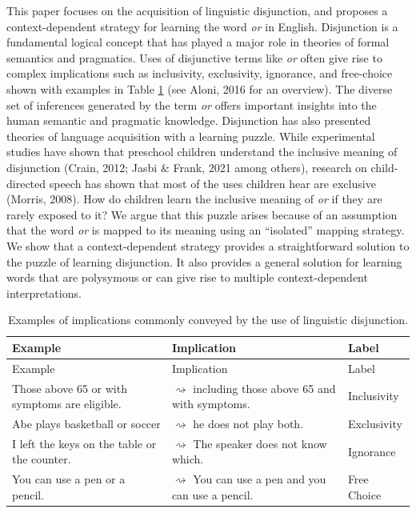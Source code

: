 \documentclass[
  english,
  ,man,floatsintext]{apa6}
\begin{document}
This paper focuses on the acquisition of linguistic disjunction, and proposes a context-dependent strategy for learning the word \emph{or} in English. Disjunction is a fundamental logical concept that has played a major role in theories of formal semantics and pragmatics. Uses of disjunctive terms like \emph{or} often give rise to complex implications such as inclusivity, exclusivity, ignorance, and free-choice shown with examples in Table \ref{tab:orexamples} (see Aloni, 2016 for an overview). The diverse set of inferences generated by the term \emph{or} offers important insights into the human semantic and pragmatic knowledge. Disjunction has also presented theories of language acquisition with a learning puzzle. While experimental studies have shown that preschool children understand the inclusive meaning of disjunction (Crain, 2012; Jasbi \& Frank, 2021 among others), research on child-directed speech has shown that most of the uses children hear are exclusive (Morris, 2008). How do children learn the inclusive meaning of \emph{or} if they are rarely exposed to it? We argue that this puzzle arises because of an assumption that the word \emph{or} is mapped to its meaning using an ``isolated'' mapping strategy. We show that a context-dependent strategy provides a straightforward solution to the puzzle of learning disjunction. It also provides a general solution for learning words that are polysymous or can give rise to multiple context-dependent interpretations.

\begin{longtable}[]{@{}
  >{\raggedright\arraybackslash}p{}
  >{\raggedright\arraybackslash}p{}
  >{\raggedright\arraybackslash}p{}@{}}
\caption{\label{tab:orexamples} Examples of implications commonly conveyed by the use of linguistic disjunction.}\tabularnewline
\toprule
Example & Implication & Label \\
\midrule
\endfirsthead
\toprule
Example & Implication & Label \\
\midrule
\endhead
Those above 65 or with symptoms are eligible. & \(\rightsquigarrow\) including those above 65 and with symptoms. & Inclusivity \\
Abe plays basketball or soccer & \(\rightsquigarrow\) he does not play both. & Exclusivity \\
I left the keys on the table or the counter. & \(\rightsquigarrow\) The speaker does not know which. & Ignorance \\
You can use a pen or a pencil. & \(\rightsquigarrow\) You can use a pen and you can use a pencil. & Free Choice \\
\bottomrule
\end{longtable}
\end{document}
